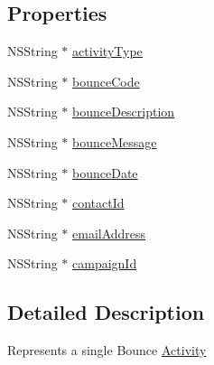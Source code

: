 \subsection*{Properties}
\begin{DoxyCompactItemize}
\item 
N\-S\-String $\ast$ \hyperlink{interface_bounce_activity_a2d36d8551ca4415732fc637b802bba49}{activity\-Type}
\item 
N\-S\-String $\ast$ \hyperlink{interface_bounce_activity_a172d4e3ee7d139e45c76a9a2c9cd0835}{bounce\-Code}
\item 
N\-S\-String $\ast$ \hyperlink{interface_bounce_activity_a968a3af10e85b34852f05ce5e8b31278}{bounce\-Description}
\item 
N\-S\-String $\ast$ \hyperlink{interface_bounce_activity_ada482cb4bacdb71831edf34f57cf5edf}{bounce\-Message}
\item 
N\-S\-String $\ast$ \hyperlink{interface_bounce_activity_a5c5df91e4fcb879c5e741daf3b792f4d}{bounce\-Date}
\item 
N\-S\-String $\ast$ \hyperlink{interface_bounce_activity_af8245514e78d4fb91e928a532045a834}{contact\-Id}
\item 
N\-S\-String $\ast$ \hyperlink{interface_bounce_activity_afe1d492ae173849f08ebfff434948564}{email\-Address}
\item 
N\-S\-String $\ast$ \hyperlink{interface_bounce_activity_a350e6393e579bbe9b4bc3fa513789049}{campaign\-Id}
\end{DoxyCompactItemize}


\subsection{Detailed Description}
Represents a single Bounce \hyperlink{interface_activity}{Activity} 

